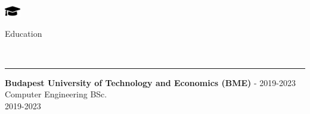 \documentclass{article}
\begin{document}
\vspace{4mm}\\
\begin{minipage}[c]{7mm}
    \includegraphics[width=7mm]{../images/graduation-cap-solid.pdf}
\end{minipage}
\begin{minipage}[c]{100mm}
    Education
\end{minipage} \\
\hrule
\vspace{4mm}

\noindent
\textbf{Budapest University of Technology and Economics (BME)} - \color{gray} 2019-2023 \color{black}\\
Computer Engineering BSc.\\
\color{gray}
2019-2023
\medskip \\
\end{document}
